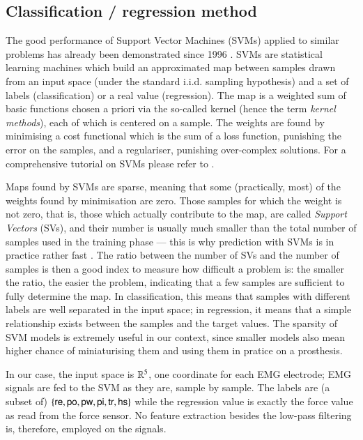 \subsection{Classification / regression method}
\label{subsec:method}

The good performance of Support Vector Machines (SVMs) applied to similar
problems has already been demonstrated since 1996 \cite{smagt06}. SVMs are
statistical learning machines \cite{v-edbed-82} which build an approximated map between
samples drawn from an input space (under the standard i.i.d. sampling hypothesis)
and a set of labels (classification) or a real value (regression).
The map is a weighted sum of basic functions chosen a priori
via the so-called kernel (hence the term \emph{kernel methods}), each of
which is centered on a sample.
The weights are found by minimising a cost functional which is the sum of
a loss function, punishing the error on the samples, and a regulariser, punishing
over-complex solutions. For a comprehensive tutorial on SVMs please refer to
\cite{Burges98,SmolaTut2004}.

Maps found by SVMs are sparse, meaning that some (practically, most) of the
weights found by minimisation are zero.
Those samples for which the weight is not zero, that is, those which actually
contribute to the map, are called \emph{Support Vectors}
(SVs), and their number is usually much smaller
than the total number of samples used in the training phase --- this is why
prediction with SVMs is in practice rather fast \cite{Cristianini00}. The
ratio between the number of SVs and the number of samples is then a good index
to measure how difficult a problem is: the smaller the ratio, the easier
the problem, indicating that a few samples are sufficient to
fully determine the map. In classification, this means that samples with different
labels are well separated in the input space; in regression, it means that a
simple relationship exists between the samples and the target values.
The sparsity of SVM models is extremely useful in our context, since
smaller models also mean higher chance of miniaturising them and using them
in pratice on a prosthesis.

In our case, the input space is $\mathbb{R}^5$, one coordinate for each EMG
electrode; EMG signals are fed to the SVM as they are, sample by sample. The labels are
(a subset of) $\{\textsf{re},\textsf{po},\textsf{pw},\textsf{pi},\textsf{tr},\textsf{hs}\}$ while the regression value is exactly the
force value as read from the force sensor. No feature extraction besides the low-pass
filtering is, therefore, employed on the signals.

